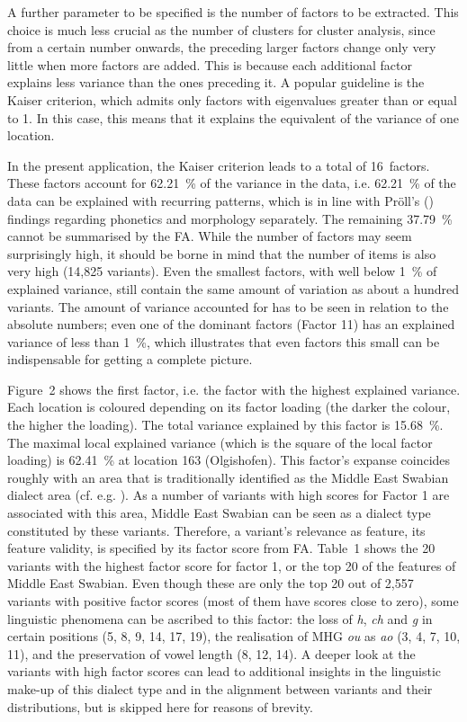 \documentclass[output=paper]{LSP/langsci}
\begin{document}
A further parameter to be specified is the number of factors to be extracted. This choice is much less crucial as the number of clusters for cluster analysis, since from a certain number onwards, the preceding larger factors change only very little when more factors are added. This is because each additional factor explains less variance than the ones preceding it. A popular guideline is the Kaiser criterion, which admits only factors with eigenvalues greater than or equal to 1. In this case, this means that it explains the equivalent of the variance of one location.

In the present application, the Kaiser criterion leads to a total of 16~factors. These factors account for 62.21~\% of the variance in the data, i.e. 62.21~\% of the data can be explained with recurring patterns, which is in line with Pröll’s (\citeyear{proll_raumvariation_2015}) findings regarding phonetics and morphology separately. The remaining 37.79~\% cannot be summarised by the FA. While the number of factors may seem surprisingly high, it should be borne in mind that the number of items is also very high (14,825 variants). Even the smallest factors, with well below 1~\% of explained variance, still contain the same amount of variation as about a hundred variants. The amount of variance accounted for has to be seen in relation to the absolute numbers; even one of the dominant factors (Factor 11) has an explained variance of less than 1~\%, which illustrates that even factors this small can be indispensable for getting a complete picture. 

Figure~2 shows the first factor, i.e. the factor with the highest explained variance. Each location is coloured depending on its factor loading (the darker the colour, the higher the loading). The total variance explained by this factor is 15.68~\%. The maximal local explained variance (which is the square of the local factor loading) is 62.41~\% at location 163 (Olgishofen). This factor’s expanse coincides roughly with an area that is traditionally identified as the Middle East Swabian dialect area (cf. e.g. \citealt[118]{nubling_studien_1988}). As a number of variants with high scores for Factor 1 are associated with this area, Middle East Swabian can be seen as a dialect type constituted by these variants. Therefore, a variant’s relevance as feature, its feature validity, is specified by its factor score from FA. Table~1 shows the 20 variants with the highest factor score for factor 1, or the top 20 of the features of Middle East Swabian. Even though these are only the top 20 out of 2,557 variants with positive factor scores (most of them have scores close to zero), some linguistic phenomena can be ascribed to this factor: the loss of \textit{h}, \textit{ch} and \textit{g} in certain positions (5, 8, 9, 14, 17, 19), the realisation of MHG \textit{ou} as \textit{ao} (3, 4, 7, 10, 11), and the preservation of vowel length (8, 12, 14). A deeper look at the variants with high factor scores can lead to additional insights in the linguistic make-up of this dialect type and in the alignment between variants and their distributions, but is skipped here for reasons of brevity. 
\end{document}
